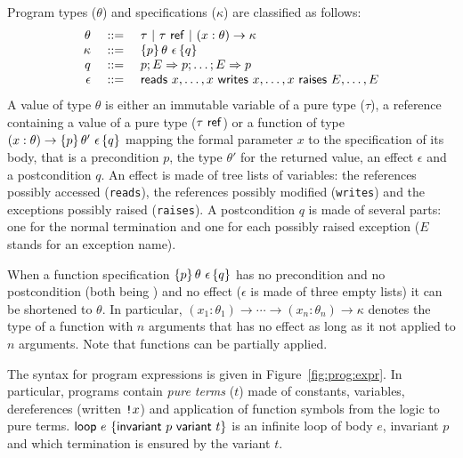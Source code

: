 \documentclass[a4paper,12pt]{report}
\begin{document}
Program types ($\theta$) and specifications ($\kappa$) 
are classified as follows:
\begin{displaymath}
  \begin{array}{rrl}
    \theta & ~::=~ & \tau ~|~ \tau~\mathsf{ref} ~|~ (x:\theta) \rightarrow\kappa \\
    \kappa &~::=~& \{p\}\,\theta~\epsilon\,\{q\} \\
    q &~::=~& p;E\Rightarrow p;\dots;E\Rightarrow p \\
    \epsilon &~::=~&
    \mathsf{reads}~x,\dots,x~\mathsf{writes}~x,\dots,x ~ \mathsf{raises}~E,\dots,E 
  \end{array}
\end{displaymath}
A value of type $\theta$ is either an immutable variable of a
pure type ($\tau$), a reference containing a value of a pure type
($\tau~\mathsf{ref}$) or a function of type
$(x:\theta)\rightarrow\{p\}\,\theta'~\epsilon\,\{q\}$ 
mapping the formal parameter $x$ to the specification of its body, that
is a precondition $p$, the type $\theta'$ for the returned value,
an effect $\epsilon$ and a postcondition $q$. An effect
is made of tree lists of variables: the references possibly accessed
(\texttt{reads}), the references possibly modified (\texttt{writes})
and the exceptions possibly raised (\texttt{raises}). A postcondition
$q$ is made of several parts: one 
for the normal termination and one for each possibly raised exception
($E$ stands for an exception name).

When a function specification $\{p\}\,\theta~\epsilon\,\{q\}$ has no
precondition and no postcondition (both being \ptrue) and no effect
($\epsilon$ is made of three empty lists) it can be shortened to
$\theta$. In particular,
$(x_1:\theta_1)\rightarrow\cdots\rightarrow(x_n:\theta_n)\rightarrow\kappa$
denotes the type of a function with $n$ arguments that has no effect
as long as it not applied to $n$ arguments. Note that functions can be
partially applied.

The syntax for program expressions is given in Figure~\ref{fig:prog:expr}.
In particular, programs contain \emph{pure terms} ($t$) made of
constants, variables, dereferences (written $\texttt{!}x$) and application
of function symbols from the logic to pure terms. 
$\mathsf{loop}~e~\{\mathsf{invariant}~p~\mathsf{variant}~t\}$ is an infinite loop of body $e$, invariant $p$ and
which termination is ensured by the variant $t$. 
\end{document}
